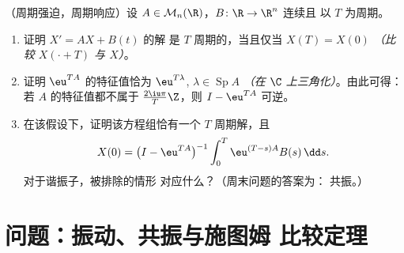 \begin{exercise}[$\star\star\star$]\label{exo:b2:diffeq:12}
（周期强迫，周期响应）设 $A \in
\mathcal{M}_n(\R)$，$B \colon \R \to \R^n$ 连续且
以 $T$ 为周期。
\begin{enumerate}
  \item 证明 $X' = AX + B(t)$ 的解
        是 $T$ 周期的，当且仅当 $X(T) = X(0)$
        \emph{（比较 $X(\cdot + T)$ 与 $X$）}。
  \item 证明 $\eu^{TA}$ 的特征值恰为
        $\eu^{T\lambda}$, $\lambda \in \operatorname{Sp}A$
        \emph{（在 $\C$ 上三角化）}。由此可得：若
        $A$ 的特征值都不属于 $\frac{2\iu\pi}{T}\Z$，则
        $I - \eu^{TA}$ 可逆。
  \item 在该假设下，证明该方程组恰有一个
        $T$ 周期解，且
        \[
        X(0) = \bigl(I - \eu^{TA}\bigr)^{-1}
        \int_0^{T}\eu^{(T-s)A}B(s)\,\dd s .
        \]
        对于谐振子，被排除的情形
        对应什么？（周末问题的答案为：
        共振。）
\end{enumerate}
\end{exercise}

\section{问题：振动、共振与施图姆
比较定理}

